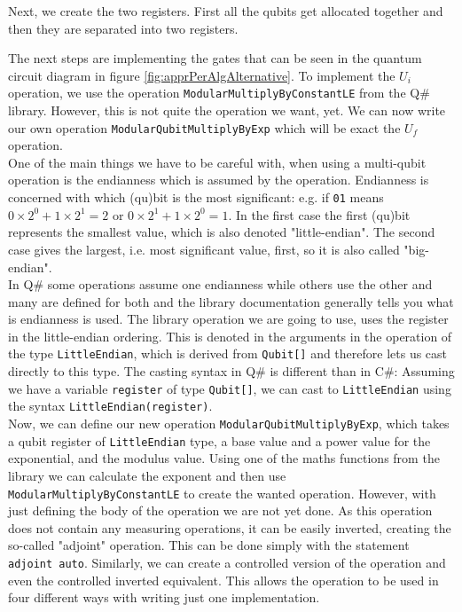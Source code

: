 

Next, we create the two registers. First all the qubits get allocated together and then they are separated into two registers. 



The next steps are implementing the gates that can be seen in the quantum circuit diagram in figure \ref{fig:apprPerAlgAlternative}. To implement the $U_i$ operation, we use the operation \texttt{ModularMultiplyByConstantLE} from the Q\# library. However, this is not quite the operation we want, yet. We can now write our own operation \texttt{ModularQubitMultiplyByExp} which will be exact the $U_f$ operation. \\
One of the main things we have to be careful with, when using a multi-qubit operation is the endianness which is assumed by the operation. Endianness is concerned with which (qu)bit is the most significant: e.g. if \texttt{01} means $0\times2^0+1\times2^1 = 2$ or $0\times2^1+1\times2^0 = 1$. In the first case the first (qu)bit represents the smallest value, which is also denoted "little-endian". The second case gives the largest, i.e. most significant value, first, so it is also called "big-endian".\\
In Q\# some operations assume one endianness while others use the other and many are defined for both and the library documentation generally tells you what is endianness is used. The library operation we are going to use, uses the register in the little-endian ordering. This is denoted in the arguments in the operation of the type \texttt{LittleEndian}, which is derived from \texttt{Qubit[]} and therefore lets us cast directly to this type. The casting syntax in Q\# is different than in C\#: Assuming we have a variable \texttt{register} of type \texttt{Qubit[]}, we can cast to \texttt{LittleEndian} using the syntax \texttt{LittleEndian(register)}.\\
Now, we can define our new operation \texttt{ModularQubitMultiplyByExp}, which takes a qubit register of \texttt{LittleEndian} type, a base value and a power value for the exponential, and the modulus value. Using one of the maths functions from the library we can calculate the exponent and then use \texttt{ModularMultiplyByConstantLE} to create the wanted operation. However, with just defining the body of the operation we are not yet done. As this operation does not contain any measuring operations, it can be easily inverted, creating the so-called "adjoint" operation. This can be done simply with the statement \texttt{adjoint auto}. Similarly, we can create a controlled version of the operation and even the controlled inverted equivalent. This allows the operation to be used in four different ways with writing just one implementation. \\

